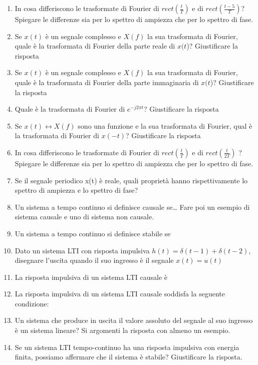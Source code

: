 \documentclass[
]{article}
\begin{document}
\begin{enumerate}
\item
  In cosa differiscono le trasformate di Fourier di
  \(rect (\frac{t}{T})\) e di \(rect (\frac{t-5}{T})\)? Spiegare le
  differenze sia per lo spettro di ampiezza che per lo spettro di fase.


\item
  Se \(x(t)\) è un segnale complesso e \(X(f)\) la sua trasformata di
  Fourier, quale è la trasformata di Fourier della parte reale di
  \(x(t\))? Giustificare la risposta
  
  \item
  Se \(x(t)\) è un segnale complesso e \(X(f)\) la sua trasformata di
  Fourier, quale è la trasformata di Fourier della parte immaginaria di
  \(x(t\))? Giustificare la risposta
\item
  Quale è la trasformata di Fourier di $ e ^{-j2 \pi t}$?
  Giustificare la risposta
\item
  Se \(x(t) \leftrightarrow X(f)\) sono una funzione e la sua
  trasformata di Fourier, qual è la trasformata di Fourier di \(x(-t)\)?
  Giustificare la risposta



\item
  In cosa differiscono le trasformate di Fourier di $rect(\frac{t}{T})$ e
  di $rect(\frac{t}{2T})$ ? Spiegare le differenze sia per lo spettro di
  ampiezza che per lo spettro di fase.


\item
  Se il segnale periodico x(t) è reale, quali proprietà hanno
  rispettivamente lo spettro di ampiezza e lo spettro di fase?


\item
Un sistema a tempo continuo si definisce causale se\ldots{} Fare poi
un esempio di sistema causale e uno di sistema non causale.

\item
Un sistema a tempo continuo si definisce stabile se

\item
Dato un sistema LTI con risposta impulsiva $h(t) = \delta (t - 1) +\delta (t - 2)$,
disegnare l'uscita quando il suo ingresso è il segnale $x(t) = u(t)$  
\item 
La risposta impulsiva di un sistema LTI causale è
\item
La risposta impulsiva di un sistema LTI causale soddisfa la seguente
condizione:
\item
Un sistema che produce in uscita il valore assoluto del segnale al suo
ingresso è un sistema lineare? Si argomenti la risposta con almeno un
esempio.
\item
Se un sistema LTI tempo-continuo ha una risposta impulsiva con energia
finita, possiamo affermare che il sistema è stabile? Giustificare la
risposta.


\end{enumerate}
\end{document}
